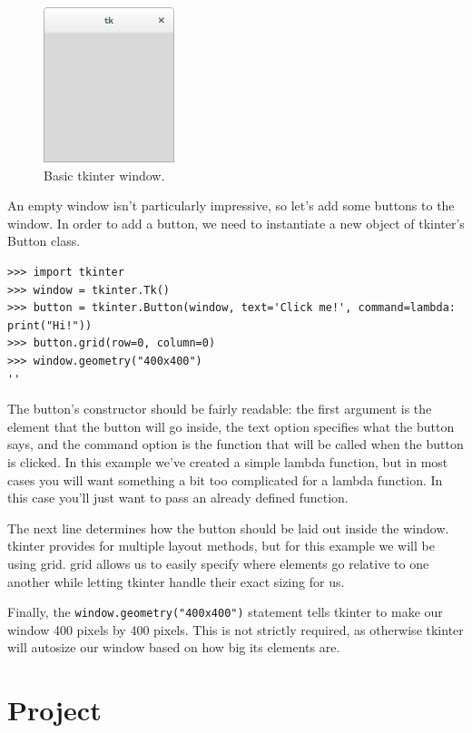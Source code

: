 \documentclass[11pt]{cselabheader}
\begin{document}
\begin{figure}[h]
  \centering
  \includegraphics[width=1.5in]{img/tk_basic}
  \caption{Basic tkinter window.}
  \label{tk_basic}
\end{figure}

An empty window isn't particularly impressive, so let's add some buttons
to the window. In order to add a button, we need to instantiate a new object
of tkinter's Button class.

\begin{lstlisting}[style=ipython]
>>> import tkinter
>>> window = tkinter.Tk()
>>> button = tkinter.Button(window, text='Click me!', command=lambda: print("Hi!"))
>>> button.grid(row=0, column=0)
>>> window.geometry("400x400")
''
\end{lstlisting}

The button's constructor should be fairly readable: the first argument is
the element that the button will go inside, the text option specifies what
the button says, and the command option is the function that will be called
when the button is clicked. In this example we've created a simple lambda
function, but in most cases you will want something a bit too complicated
for a lambda function. In this case you'll just want to pass an already defined
function.

The next line determines how the button should be laid out inside the window.
tkinter provides for multiple layout methods, but for this example we will
be using grid. grid allows us to easily specify where elements go relative
to one another while letting tkinter handle their exact sizing for us.

Finally, the \lstinline{window.geometry("400x400")} statement tells tkinter to
make our window 400 pixels by 400 pixels. This is not strictly required, as
otherwise tkinter will autosize our window based on how big its elements are.

\pagebreak

\section{Project}
\label{sec:proj}
\end{document}
